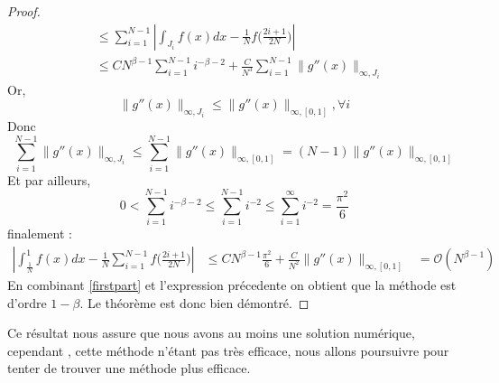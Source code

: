\documentclass[a4paper,10pt]{article}
\begin{document}
\begin{proof}
\begin{equation}
\begin{align}
									     &\leq  \sum_{i=1}^{N-1}|\int_{J_i} f(x)dx - \frac{1}{N}f\Big(\frac{2i + 1}{2N}\Big)|\\
									     &\leq C N^{\beta - 1} \sum_{i=1}^{N-1}i^{-\beta - 2} + \frac{C}{N^3}\sum_{i=1}^{N-1} \|g''(x)  \|_{\infty, J_i}
 \end{align}
\end{equation}
Or,
\begin{equation}
 \|g''(x)  \|_{\infty, J_i} \leq \|g''(x)  \|_{\infty, [0,1]}, \forall i
\end{equation}
Donc
\begin{equation}
 \sum_{i=1}^{N-1}\|g''(x)  \|_{\infty, J_i} \leq \sum_{i=1}^{N-1}\|g''(x)  \|_{\infty, [0,1]} = (N-1)\|g''(x)  \|_{\infty, [0,1]} 
\end{equation}
Et par ailleurs,
\begin{equation}
 0 < \sum_{i=1}^{N-1}i^{-\beta - 2} \leq \sum_{i=1}^{N-1}i^{- 2} \leq \sum_{i=1}^{\infty}i^{- 2} = \frac{\pi ^2}{6}  
\end{equation}
finalement :
\begin{equation}
\begin{align}
 |\int_\frac{1}{N}^1f(x)dx - \frac{1}{N}\sum_{i=1}^{N-1}f\Big(\frac{2i + 1}{2N}\Big)| &\leq C N^{\beta - 1} \frac{\pi ^2}{6}  + \frac{C}{N^2}\|g''(x)  \|_{\infty, [0,1]} 
									     &= \mathcal{O}(N^{\beta - 1}) 
\end{align}
\end{equation}
 En combinant \ref{firstpart} et l'expression pr\'ecedente on obtient que la m\'ethode est d'ordre $1- \beta$. Le th\'eor\`eme est donc bien d\'emontr\'e.
\end{proof}
Ce r\'esultat nous assure que nous avons au moins une solution num\'erique, cependant , cette m\'ethode n'\'etant pas tr\`es efficace, nous allons poursuivre pour tenter de
trouver une m\'ethode plus efficace.
\end{document}
